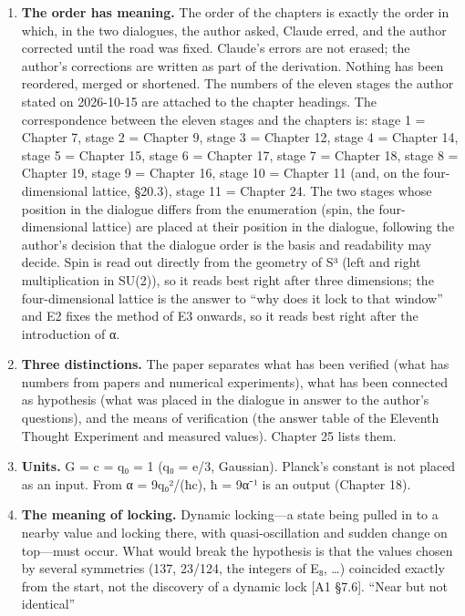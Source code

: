 \documentclass[
  a4paper,
]{article}
\providecommand{\tightlist}{%
  \setlength{\itemsep}{0pt}\setlength{\parskip}{0pt}}
\begin{document}
\begin{enumerate}
\def\labelenumi{\arabic{enumi}.}
\tightlist
\item
  \textbf{The order has meaning.} The order of the chapters is exactly
  the order in which, in the two dialogues, the author asked, Claude
  erred, and the author corrected until the road was fixed. Claude's
  errors are not erased; the author's corrections are written as part of
  the derivation. Nothing has been reordered, merged or shortened. The
  numbers of the eleven stages the author stated on 2026-10-15 are
  attached to the chapter headings. The correspondence between the
  eleven stages and the chapters is: stage 1 = Chapter 7, stage 2 =
  Chapter 9, stage 3 = Chapter 12, stage 4 = Chapter 14, stage 5 =
  Chapter 15, stage 6 = Chapter 17, stage 7 = Chapter 18, stage 8 =
  Chapter 19, stage 9 = Chapter 16, stage 10 = Chapter 11 (and, on the
  four-dimensional lattice, §20.3), stage 11 = Chapter 24. The two
  stages whose position in the dialogue differs from the enumeration
  (spin, the four-dimensional lattice) are placed at their position in
  the dialogue, following the author's decision that the dialogue order
  is the basis and readability may decide. Spin is read out directly
  from the geometry of S³ (left and right multiplication in SU(2)), so
  it reads best right after three dimensions; the four-dimensional
  lattice is the answer to ``why does it lock to that window'' and E2
  fixes the method of E3 onwards, so it reads best right after the
  introduction of α.
\item
  \textbf{Three distinctions.} The paper separates what has been
  verified (what has numbers from papers and numerical experiments),
  what has been connected as hypothesis (what was placed in the dialogue
  in answer to the author's questions), and the means of verification
  (the answer table of the Eleventh Thought Experiment and measured
  values). Chapter 25 lists them.
\item
  \textbf{Units.} G = c = q₀ = 1 (q₀ = e/3, Gaussian). Planck's constant
  is not placed as an input. From α = 9q₀²/(ħc), ħ = 9α⁻¹ is an output
  (Chapter 18).
\item
  \textbf{The meaning of locking.} Dynamic locking---a state being
  pulled in to a nearby value and locking there, with quasi-oscillation
  and sudden change on top---must occur. What would break the hypothesis
  is that the values chosen by several symmetries (137, 23/124, the
  integers of E₈, \ldots) coincided exactly from the start, not the
  discovery of a dynamic lock {[}A1 §7.6{]}. ``Near but not identical''

\end{enumerate}
\end{document}
